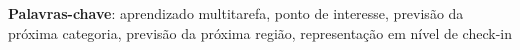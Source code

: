 \begin{resumo}[Resumo]
        \vspace{\onelineskip}
        \noindent
        \begin{minipage}{\linewidth}
            \textbf{Palavras-chave}:
            aprendizado multitarefa, ponto de interesse, previsão da próxima categoria,
            previsão da próxima região, representação em nível de check-in
        \end{minipage}
    \end{resumo}

